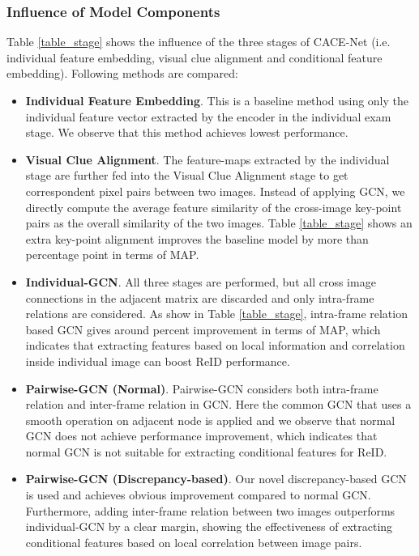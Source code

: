 \documentclass[final]{cvpr}
\begin{document}
\subsubsection{Influence of Model Components}
Table \ref{table_stage} shows the influence of the three stages of CACE-Net  (i.e. individual feature embedding, visual clue alignment and conditional feature embedding). Following methods are compared:
\begin{itemize}[leftmargin=*]
\setlength\itemsep{-5pt}
    \item \textbf{Individual Feature Embedding}.  This is a baseline method using only the individual feature vector extracted by the encoder in the individual exam stage. We observe that this method achieves lowest performance. 
    \item \textbf{Visual Clue Alignment}. The feature-maps extracted by the individual stage are further fed into the Visual Clue Alignment stage to get correspondent pixel pairs between two images. Instead of applying GCN, we directly compute the average feature similarity of the cross-image key-point pairs as the overall similarity of the two images. Table \ref{table_stage} shows an extra key-point alignment improves the baseline model by more than  percentage point in terms of MAP. \item \textbf{Individual-GCN}. All three stages are performed, but all cross image connections in the adjacent matrix are discarded and only intra-frame relations are considered. As show in Table \ref{table_stage}, intra-frame relation based GCN gives around  percent improvement in terms of MAP, which indicates that extracting features based on local information and correlation inside individual image can boost ReID performance.  
    \item \textbf{Pairwise-GCN (Normal)}. Pairwise-GCN considers both intra-frame relation and inter-frame relation in GCN. Here the common GCN that uses a smooth operation on adjacent node is applied and we observe that normal GCN does not achieve performance improvement, which indicates that normal GCN is not suitable for extracting conditional features for ReID. 
    \item \textbf{Pairwise-GCN (Discrepancy-based)}. Our novel discrepancy-based GCN is used and achieves obvious improvement compared to normal GCN. Furthermore, adding inter-frame relation between two images outperforms individual-GCN by a clear margin, showing the effectiveness of extracting conditional features based on local correlation between image pairs. 
\end{itemize}
\end{document}
